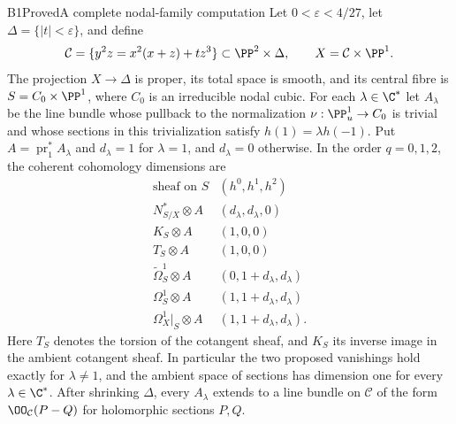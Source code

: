 \begin{statement}{B1}{Proved}{A complete nodal-family computation}
Let $0<\varepsilon<4/27$, let $\Delta=\{|t|<\varepsilon\}$, and define
\[
 \mathcal C=\{y^2z=x^2(x+z)+tz^3\}\subset\PP^2\times\Delta,
 \qquad X=\mathcal C\times\PP^1.
\]
The projection $X\to\Delta$ is proper, its total space is smooth, and its central fibre is $S=C_0\times\PP^1$, where $C_0$ is an irreducible nodal cubic. For each $\lambda\in\C^*$ let $A_\lambda$ be the line bundle whose pullback to the normalization $\nu:\PP^1_u\to C_0$ is trivial and whose sections in this trivialization satisfy $h(1)=\lambda h(-1)$. Put $A=\operatorname{pr}_1^*A_\lambda$ and $d_\lambda=1$ for $\lambda=1$, and $d_\lambda=0$ otherwise. In the order $q=0,1,2$, the coherent cohomology dimensions are
\[
\begin{array}{c|c}
\text{sheaf on }S & (h^0,h^1,h^2)\\\hline
 N^*_{S/X}\otimes A &(d_\lambda,d_\lambda,0)\\
 K_S\otimes A &(1,0,0)\\
 T_S\otimes A &(1,0,0)\\
 \widetilde\Omega^1_S\otimes A &(0,1+d_\lambda,d_\lambda)\\
 \Omega^1_S\otimes A &(1,1+d_\lambda,d_\lambda)\\
 \Omega^1_X|_S\otimes A &(1,1+d_\lambda,d_\lambda).
\end{array}                                                    \tag{B.1}
\]
Here $T_S$ denotes the torsion of the cotangent sheaf, and $K_S$ its inverse image in the ambient cotangent sheaf. In particular the two proposed vanishings hold exactly for $\lambda\ne1$, and the ambient space of sections has dimension one for every $\lambda\in\C^*$. After shrinking $\Delta$, every $A_\lambda$ extends to a line bundle on $\mathcal C$ of the form $\OO_{\mathcal C}(P-Q)$ for holomorphic sections $P,Q$.
\end{statement}

